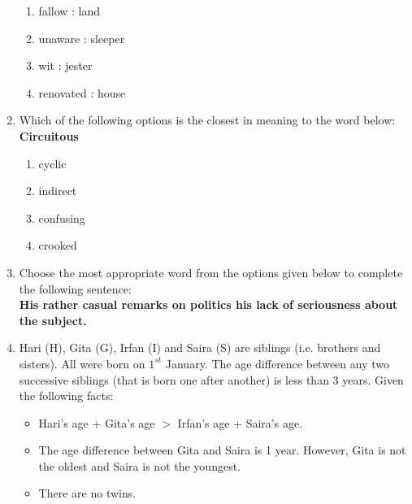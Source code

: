 \documentclass[journal,12pt,onecolumn]{IEEEtran}
\theoremstyle{remark}
\begin{document}
\begin{enumerate}
\hfill{}
\begin{enumerate}
    \item fallow : land
    \item unaware : sleeper
    \item wit : jester
    \item renovated : house
\end{enumerate}

\vspace{0.5cm}

\item Which of the following options is the closest in meaning to the word below: \\
\textbf{Circuitous}
\hfill{}\begin{enumerate}
    \item cyclic
    \item indirect
    \item confusing
    \item crooked
\end{enumerate}

\vspace{0.5cm}

\item Choose the most appropriate word from the options given below to complete the following sentence: \\
\textbf{His rather casual remarks on politics \underline{\hspace{2cm}} his lack of seriousness about the subject.}
\hfill{}\begin{enumerate}  \end{enumerate}

\newpage

\item Hari (H), Gita (G), Irfan (I) and Saira (S) are siblings (i.e. brothers and sisters). All were born on $1^{st}$ January. The age difference between any two successive siblings (that is born one after another) is less than 3 years. Given the following facts:

\begin{itemize}
    \item Hari's age + Gita's age $>$ Irfan's age + Saira's age.
    \item The age difference between Gita and Saira is 1 year. However, Gita is not the oldest and Saira is not the youngest.
    \item There are no twins. 
\end{itemize}


\end{enumerate}
\end{document}
